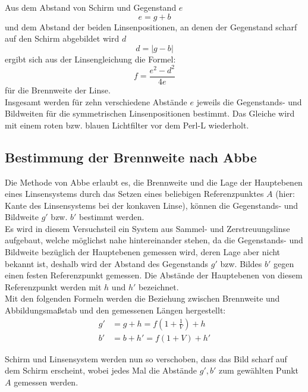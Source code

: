 Aus dem Abstand von Schirm und Gegenstand $e$
%
\begin{equation}
  e = g + b
\end{equation} 
%
und dem Abstand der beiden Linsenpositionen, an denen der Gegenstand
scharf auf den Schirm abgebildet wird $d$ 
%
\begin{equation}
  d = |g - b|
\end{equation}
%
ergibt sich aus der Linsengleichung die Formel:
%
\begin{equation} 
f = \frac{e^2 - d^2}{4e}
\end{equation}
%
für die Brennweite der Linse.\\
Insgesamt werden für zehn verschiedene
Abstände $e$ jeweils die Gegenstands- und Bildweiten für die
symmetrischen Linsenpositionen bestimmt.
Das Gleiche wird mit einem roten bzw. blauen Lichtfilter vor dem Perl-L wiederholt.

\subsection{Bestimmung der Brennweite nach Abbe}

Die Methode von Abbe erlaubt es, die Brennweite und die Lage der
Hauptebenen eines Linsensystems durch das Setzen eines beliebigen Referenzpunktes $A$ (hier: Kante des Linsensystems bei der konkaven Linse), können die Gegenstands- und Bildweite $g'$ bzw. $b'$ bestimmt werden.\\
Es wird in diesem Versuchsteil ein System aus Sammel- und Zerstreuungslinse
aufgebaut, welche möglichst nahe hintereinander stehen, da die Gegenstands- und Bildweite bezüglich der Hauptebenen gemessen wird, deren Lage aber nicht bekannt ist, deshalb wird der Abstand des Gegenstands $g'$
bzw. Bildes $b'$ gegen einen festen Referenzpunkt gemessen. Die Abstände der Hauptebenen von diesem Referenzpunkt werden mit $h$ und $h'$
bezeichnet.\\
Mit den folgenden Formeln werden die Beziehung zwischen
Brennweite und Abbildungsmaßstab und den gemessenen Längen hergestellt:
%
\begin{align}
  g' &= g + h  = f \left(1 + \frac{1}{V}\right) + h\\
  b' &= b + h' = f (1 + V) + h'
\end{align}

Schirm und Linsensystem werden nun so verschoben, dass das Bild
scharf auf dem Schirm erscheint, wobei jedes Mal die Abstände $g', b'$ zum gewählten Punkt $A$ gemessen werden.
